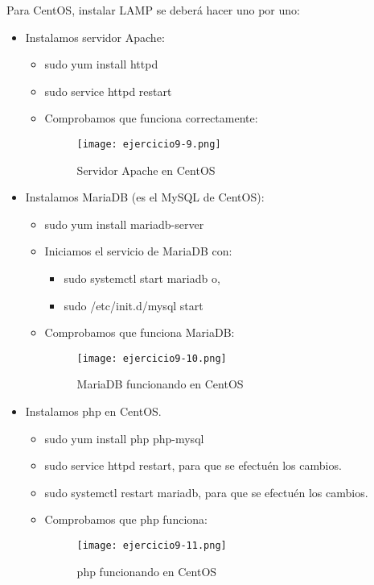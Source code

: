 	Para CentOS, instalar LAMP se deberá hacer uno por uno:
	\begin{itemize}
		\item Instalamos servidor Apache\cite{ejercicio9-8}:
			\begin{itemize}
				\item sudo yum install httpd
				\item sudo service httpd restart
				\item Comprobamos que funciona correctamente:
					\begin{figure}[H]	
						\centering
						\texttt{[image: ejercicio9-9.png]} 
						\label{figura74} 
						\caption{Servidor Apache en CentOS}
					\end{figure}
			\end{itemize}
		\item Instalamos MariaDB (es el MySQL de CentOS)\cite{ejercicio9-9,ejercicio9-10}:
			\begin{itemize}
				\item sudo yum install mariadb-server
				\item Iniciamos el servicio de MariaDB con: 		\begin{itemize}
					\item sudo systemctl start mariadb o,
					\item sudo /etc/init.d/mysql start
				\end{itemize}
				\item Comprobamos que funciona MariaDB\cite{ejercicio9-11}:
					\begin{figure}[H]	
						\centering
						\texttt{[image: ejercicio9-10.png]} 
						\label{figura75} 
						\caption{MariaDB funcionando en CentOS}
					\end{figure}
			\end{itemize}
		\item Instalamos php en CentOS.
		\begin{itemize}
			\item sudo yum install php php-mysql
			\item sudo service httpd restart, para que se efectuén los cambios.
			\item sudo systemctl restart mariadb, para que se efectuén los cambios.
			\item Comprobamos que php funciona:
					\begin{figure}[H]	
						\centering
						\texttt{[image: ejercicio9-11.png]} 
						\label{figura76} 
						\caption{php funcionando en CentOS}
					\end{figure}
		\end{itemize}
	\end{itemize}
	
